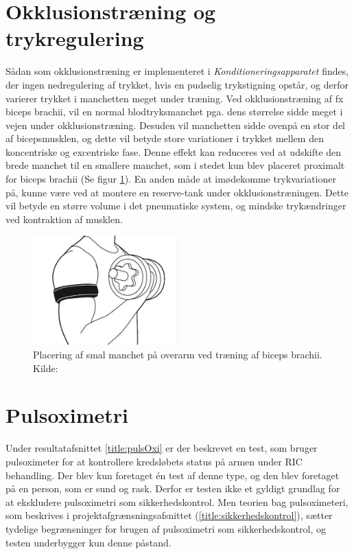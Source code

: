 \section{Okklusionstræning og trykregulering}
Sådan som okklusionstræning er implementeret i \textit{Konditioneringsapparatet} findes, der ingen nedregulering af trykket, hvis en pudselig trykstigning opstår, og derfor varierer trykket i manchetten meget under træning. Ved okklusionstræning af fx biceps brachii, vil en normal blodtryksmanchet pga. dens størrelse sidde meget i vejen under okklusionstræning. Desuden vil manchetten sidde ovenpå en stor del af bicepsmusklen, og dette vil betyde store variationer i trykket mellem den koncentriske og excentriske fase. Denne effekt kan reduceres ved at udskifte den brede manchet til en smallere manchet, som i stedet kun blev placeret proximalt for biceps brachii (Se figur \ref{fig:okklcuff}). En anden måde at imødekomme trykvariationer på, kunne være ved at montere en \textquotedbl reserve-tank\textquotedbl{} under okklusionstræningen. Dette vil betyde en større volume i det pneumatiske system, og mindske trykændringer ved kontraktion af musklen. 
\begin{figure}[H]
	\centering
	\includegraphics[trim={1.5cm 0 1.5cm 0}, clip, width=0.5\textwidth]{billeder/okklusionCuff.png}
	\caption{Placering af smal manchet på overarm ved træning af biceps brachii. Kilde: \cite{Billede:3}}\label{fig:okklcuff}
\end{figure}

\section{Pulsoximetri}
Under resultatafsnittet \ref{title:pulsOxi} er der beskrevet en test, som bruger pulsoximeter for at kontrollere kredsløbets status på armen under RIC behandling. Der blev kun foretaget én test af denne type, og den blev foretaget på en person, som er sund og rask. Derfor er testen ikke et gyldigt grundlag for at ekskludere pulsoximetri som sikkerhedskontrol. Men teorien bag pulsoximeteri, som beskrives i projektafgrænsningsafsnittet (\ref{title:sikkerhedskontrol}), sætter tydelige begrænsninger for brugen af pulsoximetri som sikkerhedskontrol, og testen underbygger kun denne påstand. 

